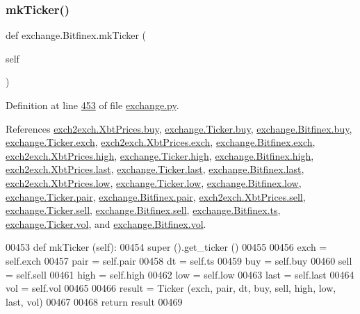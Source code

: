 \subsubsection{\texorpdfstring{mk\+Ticker()}{mkTicker()}}
{\footnotesize\ttfamily def exchange.\+Bitfinex.\+mk\+Ticker (\begin{DoxyParamCaption}\item[{}]{self }\end{DoxyParamCaption})}



Definition at line \hyperlink{exchange_8py_source_l00453}{453} of file \hyperlink{exchange_8py_source}{exchange.\+py}.



References \hyperlink{exch2exch_8py_source_l00059}{exch2exch.\+Xbt\+Prices.\+buy}, \hyperlink{exchange_8py_source_l00060}{exchange.\+Ticker.\+buy}, \hyperlink{exchange_8py_source_l00430}{exchange.\+Bitfinex.\+buy}, \hyperlink{exchange_8py_source_l00057}{exchange.\+Ticker.\+exch}, \hyperlink{exch2exch_8py_source_l00064}{exch2exch.\+Xbt\+Prices.\+exch}, \hyperlink{exchange_8py_source_l00424}{exchange.\+Bitfinex.\+exch}, \hyperlink{exch2exch_8py_source_l00061}{exch2exch.\+Xbt\+Prices.\+high}, \hyperlink{exchange_8py_source_l00062}{exchange.\+Ticker.\+high}, \hyperlink{exchange_8py_source_l00432}{exchange.\+Bitfinex.\+high}, \hyperlink{exch2exch_8py_source_l00063}{exch2exch.\+Xbt\+Prices.\+last}, \hyperlink{exchange_8py_source_l00064}{exchange.\+Ticker.\+last}, \hyperlink{exchange_8py_source_l00434}{exchange.\+Bitfinex.\+last}, \hyperlink{exch2exch_8py_source_l00062}{exch2exch.\+Xbt\+Prices.\+low}, \hyperlink{exchange_8py_source_l00063}{exchange.\+Ticker.\+low}, \hyperlink{exchange_8py_source_l00433}{exchange.\+Bitfinex.\+low}, \hyperlink{exchange_8py_source_l00058}{exchange.\+Ticker.\+pair}, \hyperlink{exchange_8py_source_l00425}{exchange.\+Bitfinex.\+pair}, \hyperlink{exch2exch_8py_source_l00058}{exch2exch.\+Xbt\+Prices.\+sell}, \hyperlink{exchange_8py_source_l00061}{exchange.\+Ticker.\+sell}, \hyperlink{exchange_8py_source_l00431}{exchange.\+Bitfinex.\+sell}, \hyperlink{exchange_8py_source_l00428}{exchange.\+Bitfinex.\+ts}, \hyperlink{exchange_8py_source_l00065}{exchange.\+Ticker.\+vol}, and \hyperlink{exchange_8py_source_l00435}{exchange.\+Bitfinex.\+vol}.


\begin{DoxyCode}
00453     \textcolor{keyword}{def }mkTicker (self):
00454         super ().get\_ticker ()
00455         
00456         exch = self.exch
00457         pair = self.pair
00458         dt   = self.ts
00459         buy  = self.buy
00460         sell = self.sell
00461         high = self.high
00462         low  = self.low
00463         last = self.last
00464         vol  = self.vol
00465         
00466         result = Ticker (exch, pair, dt, buy, sell, high, low, last, vol)
00467         
00468         \textcolor{keywordflow}{return} result
00469     
\end{DoxyCode}
\mbox{\label{classexchange_1_1_bitfinex_a8e6513876891b917f246507f37d7e179}} 
